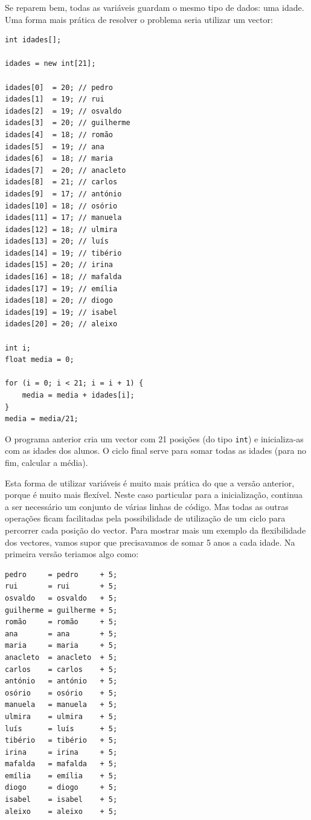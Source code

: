 Se reparem bem, todas as variáveis guardam o mesmo tipo de dados: uma idade.
Uma forma mais prática de resolver o problema seria utilizar um vector:
\begin{lstlisting}
int idades[];

idades = new int[21]; 

idades[0]  = 20; // pedro
idades[1]  = 19; // rui  
idades[2]  = 19; // osvaldo
idades[3]  = 20; // guilherme 
idades[4]  = 18; // romão     
idades[5]  = 19; // ana     
idades[6]  = 18; // maria   
idades[7]  = 20; // anacleto  
idades[8]  = 21; // carlos   
idades[9]  = 17; // antónio 
idades[10] = 18; // osório    
idades[11] = 17; // manuela  
idades[12] = 18; // ulmira    
idades[13] = 20; // luís     
idades[14] = 19; // tibério 
idades[15] = 20; // irina 
idades[16] = 18; // mafalda 
idades[17] = 19; // emília 
idades[18] = 20; // diogo 
idades[19] = 19; // isabel 
idades[20] = 20; // aleixo 

int i;
float media = 0;

for (i = 0; i < 21; i = i + 1) {
    media = media + idades[i];
}
media = media/21;
\end{lstlisting}
O programa anterior cria um vector com 21 posições (do tipo \texttt{int}) e inicializa-as com as idades dos alunos.
O ciclo final serve para somar todas as idades (para no fim, calcular a média).

Esta forma de utilizar variáveis é muito mais prática do que a versão anterior, porque é muito mais flexível. Neste caso particular para a inicialização, continua a ser necessário um conjunto de várias linhas de código. Mas todas as outras operações ficam facilitadas pela possibilidade de utilização de um ciclo para percorrer cada posição do vector. Para mostrar mais um exemplo da flexibilidade dos vectores, vamos supor que precisavamos de somar 5 anos a cada idade. Na primeira versão teriamos algo como:
\begin{lstlisting}
pedro     = pedro     + 5;
rui       = rui       + 5;
osvaldo   = osvaldo   + 5;
guilherme = guilherme + 5;
romão     = romão     + 5;
ana       = ana       + 5;
maria     = maria     + 5;
anacleto  = anacleto  + 5;
carlos    = carlos    + 5;
antónio   = antónio   + 5;
osório    = osório    + 5;
manuela   = manuela   + 5;
ulmira    = ulmira    + 5;
luís      = luís      + 5;
tibério   = tibério   + 5;
irina     = irina     + 5;
mafalda   = mafalda   + 5;
emília    = emília    + 5;
diogo     = diogo     + 5;
isabel    = isabel    + 5;
aleixo    = aleixo    + 5;
\end{lstlisting} 

